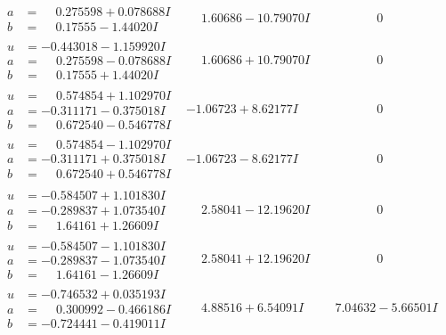\documentclass[1p]{elsarticle_modified}
\theoremstyle{definition}
\begin{document}
$$\begin{array}{c|c|c}
\begin{aligned}
a &= \phantom{-}0.275598 + 0.078688 I \\
b &= \phantom{-}0.17555 - 1.44020 I\end{aligned}
 & \phantom{-}1.60686 - 10.79070 I & \phantom{-0.000000 } 0 \\ \hline\begin{aligned}
u &= -0.443018 - 1.159920 I \\
a &= \phantom{-}0.275598 - 0.078688 I \\
b &= \phantom{-}0.17555 + 1.44020 I\end{aligned}
 & \phantom{-}1.60686 + 10.79070 I & \phantom{-0.000000 } 0 \\ \hline\begin{aligned}
u &= \phantom{-}0.574854 + 1.102970 I \\
a &= -0.311171 - 0.375018 I \\
b &= \phantom{-}0.672540 - 0.546778 I\end{aligned}
 & -1.06723 + 8.62177 I & \phantom{-0.000000 } 0 \\ \hline\begin{aligned}
u &= \phantom{-}0.574854 - 1.102970 I \\
a &= -0.311171 + 0.375018 I \\
b &= \phantom{-}0.672540 + 0.546778 I\end{aligned}
 & -1.06723 - 8.62177 I & \phantom{-0.000000 } 0 \\ \hline\begin{aligned}
u &= -0.584507 + 1.101830 I \\
a &= -0.289837 + 1.073540 I \\
b &= \phantom{-}1.64161 + 1.26609 I\end{aligned}
 & \phantom{-}2.58041 - 12.19620 I & \phantom{-0.000000 } 0 \\ \hline\begin{aligned}
u &= -0.584507 - 1.101830 I \\
a &= -0.289837 - 1.073540 I \\
b &= \phantom{-}1.64161 - 1.26609 I\end{aligned}
 & \phantom{-}2.58041 + 12.19620 I & \phantom{-0.000000 } 0 \\ \hline\begin{aligned}
u &= -0.746532 + 0.035193 I \\
a &= \phantom{-}0.300992 - 0.466186 I \\
b &= -0.724441 - 0.419011 I\end{aligned}
 & \phantom{-}4.88516 + 6.54091 I & \phantom{-}7.04632 - 5.66501 I\\

\end{array}$$
\end{document}
